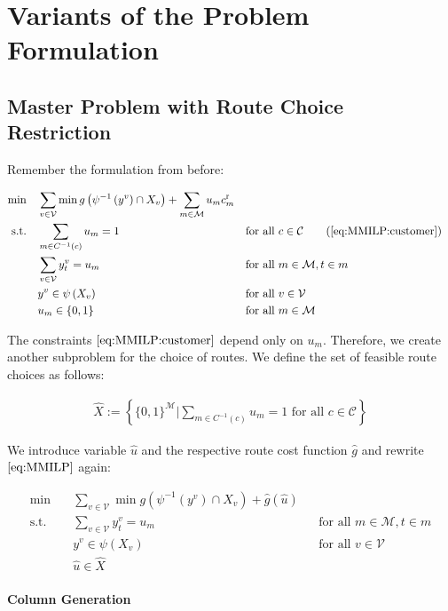 \section{Variants of the Problem Formulation}

\subsection{Master Problem with Route Choice Restriction}

Remember the formulation from before:

\begin{align*}
	\min \quad & \sum_{v\in\mathcal{V}}\min g\left(\psi^{-1}\left(y^v\right)\cap X_v\right) + \sum_{m\in\mathcal{M}}u_m\croute_m \\
	\text{s.t.} \quad & \sum_{m\in C^{-1}(c)} u_m = 1 && \text{for all } c\in\mathcal{C} \tag{\ref{eq:MMILP:customer}} \\
	& \sum_{v\in\mathcal{V}}y^v_t = u_m && \text{for all } m\in\mathcal{M},t\in m \\
	& y^v\in \psi\left(X_v\right) && \text{for all } v\in\mathcal{V} \\
	& u_m\in\{0,1\} && \text{for all } m\in\mathcal{M}
\end{align*}

The constraints $\eqref{eq:MMILP:customer}$ depend only on $u_m$. Therefore, we create another subproblem for the choice of routes. We define the set of feasible route choices as follows:

\begin{align*}
	\hat{X} := \left\{\{0,1\}^{\mathcal{M}}|\sum_{m\in C^{-1}(c)} u_m = 1 \text{ for all } c\in\mathcal{C}\right\}
\end{align*}

We introduce variable $\hat{u}$ and the respective route cost function $\hat{g}$ and rewrite $\eqref{eq:MMILP}$ again:

\begin{align*}
	\min \quad & \sum_{v\in\mathcal{V}} \min g\left(\psi^{-1}\left(y^v\right)\cap X_v\right) + \hat{g}\left(\hat{u}\right) \\
	\text{s.t.} \quad & \sum_{v\in\mathcal{V}}y_t^v = u_m && \text{for all } m\in\mathcal{M},t\in m \\
	& y^v\in \psi\left(X_v\right) && \text{for all } v\in\mathcal{V} \\
	& \hat{u}\in\hat{X}
\end{align*}

\paragraph{Column Generation} \parfill

